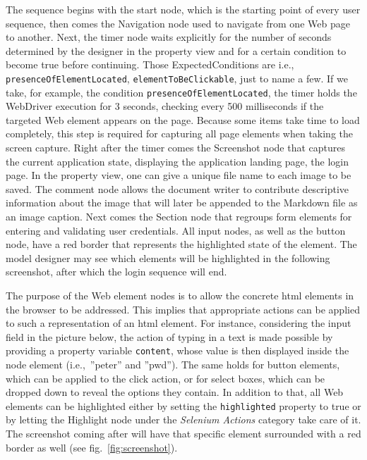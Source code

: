 The sequence begins with the start node, which is the starting point of every user sequence, then comes the Navigation node used to navigate from one Web page to another. Next, the timer node waits explicitly for the number of seconds determined by the designer in the property view and for a certain condition to become true before continuing. Those ExpectedConditions are i.e., \lstinline{presenceOfElementLocated}, \lstinline{elementToBeClickable}, just to name a few. If we take, for example, the condition \lstinline{presenceOfElementLocated}, the timer holds the WebDriver execution for 3 seconds, checking every 500 milliseconds if the targeted Web element appears on the page. Because some items take time to load completely, this step is required for capturing all page elements when taking the screen capture. Right after the timer comes the Screenshot node that captures the current application state, displaying the application landing page, the login page. In the property view, one can give a unique file name to each image to be saved. The comment node allows the document writer to contribute descriptive information about the image that will later be appended to the Markdown file as an image caption. Next comes the Section node that regroups form elements for entering and validating user credentials. All input nodes, as well as the button node, have a red border that represents the highlighted state of the element. The model designer may see which elements will be highlighted in the following screenshot, after which the login sequence will end. 

The purpose of the Web element nodes is to allow the concrete \gls*{html} elements in the browser to be addressed. This implies that appropriate actions can be applied to such a representation of an \gls*{html} element. For instance, considering the input field in the picture below, the action of typing in a text is made possible by providing a property variable \lstinline{content}, whose value is then displayed inside the node element (i.e.,~''peter'' and ''pwd''). The same holds for button elements, which can be applied to the click action, or for select boxes, which can be dropped down to reveal the options they contain. In addition to that, all Web elements can be highlighted either by setting the \lstinline{highlighted} property to true or by letting the Highlight node under the \textit{Selenium Actions} category take care of it. The screenshot coming after will have that specific element surrounded with a red border as well (see fig.~\ref{fig:screenshot}).

